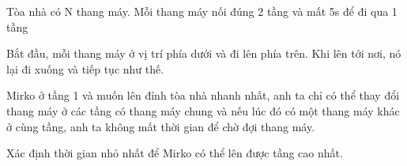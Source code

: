Tòa nhà có N thang máy. Mỗi thang máy nối đúng 2 tầng và mất 5s để đi qua 1 tầng  

   Bắt đầu, mỗi thang máy ở vị trí phía dưới và đi lên phía trên. Khi lên tới nơi, nó lại đi xuống và tiếp tục như thế.  

   Mirko ở tầng 1 và muốn lên đỉnh tòa nhà nhanh nhất, anh ta chỉ có thể thay đổi thang máy ở các tầng có thang máy chung và nếu lúc đó có một thang máy khác ở cùng tầng, anh ta không mất thời gian để chờ đợi thang máy.  

   Xác định thời gian nhỏ nhất để Mirko có thể lên được tầng cao nhất.  



\